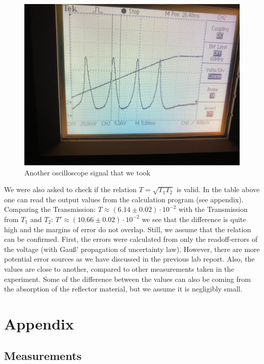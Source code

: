 \documentclass{article}
\begin{document}
\begin{figure}[h!]
\includegraphics[width=\textwidth]{oszilloskopbild 2.jpg}
\caption{Another oscilloscope signal that we took}
\label{Osz2}
\end{figure}

We were also asked to check if the relation $T = \sqrt{T_{1}T_{2}}$ is valid. In the table above one can read the output values from the calculation program (see appendix). Comparing the Transmission: $T \approx (6.14 \pm 0.02) \cdot 10^{-2}$ with the Transmission from $T_{1}$ and $T_{2}$: $T' \approx (10.66 \pm 0.02) \cdot 10^{-2}$ we see that the difference is quite high and the margins of error do not overlap. Still, we assume that the relation can be confirmed. First, the errors were calculated from only the readoff-errors of the voltage (with Gauß' propagation of uncertainty law). However, there are more potential error sources as we have discussed in the previous lab report. Also, the values are close to another, compared to other measurements taken in the experiment. Some of the difference between the values can also be coming from the absorption of the reflector material, but we assume it is negligibly small.

\section{Appendix}

\subsection{Measurements}
\end{document}
